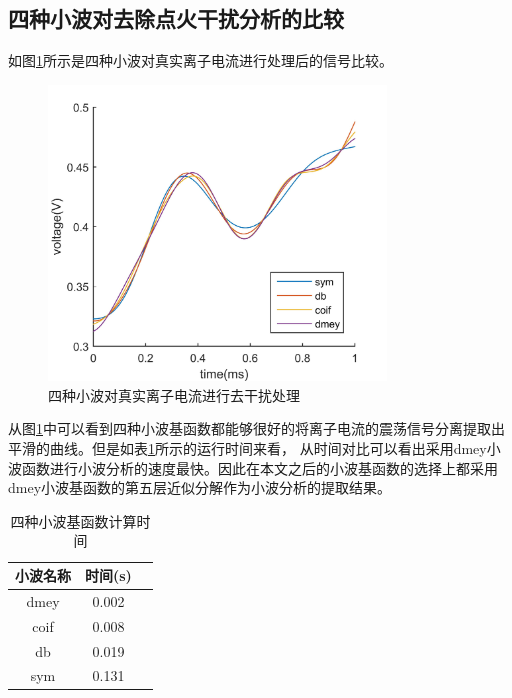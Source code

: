 \subsection{四种小波对去除点火干扰分析的比较}
如图\ref{fig:diff_wv_comp}所示是四种小波对真实离子电流进行处理后的信号比较。
\begin{figure}[H]
	\centering
	\includegraphics[width=0.8\textwidth]{thesis_figure/ion_chapter/diff_wv_comp}
	\caption{\label{fig:diff_wv_comp}四种小波对真实离子电流进行去干扰处理}
\end{figure}
从图\ref{fig:diff_wv_comp}中可以看到四种小波基函数都能够很好的将离子电流的震荡信号分离提取出平滑的曲线。但是如表\ref{wv_diff}所示的运行时间来看，
从时间对比可以看出采用dmey小波函数进行小波分析的速度最快。因此在本文之后的小波基函数的选择上都采用dmey小波基函数的第五层近似分解作为小波分析的提取结果。
\begin{table}[!htb]
	\centering
	\caption{\label{wv_diff}四种小波基函数计算时间}
	\begin{tabular}{ccc}
		\toprule[1.5pt]
		小波名称&时间(s)&\\
		\midrule[1pt]
		dmey & 0.002&    	\\
		coif & 0.008&     	\\
		db   & 0.019&		\\
		sym  & 0.131&		\\
		\bottomrule[1.5pt]
	\end{tabular}
\end{table}
